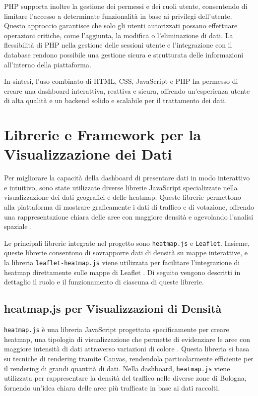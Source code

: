 PHP supporta inoltre la gestione dei permessi e dei ruoli utente, consentendo di limitare l’accesso a determinate funzionalità in base ai privilegi dell’utente. Questo approccio garantisce che solo gli utenti autorizzati possano effettuare operazioni critiche, come l’aggiunta, la modifica o l’eliminazione di dati. La flessibilità di PHP nella gestione delle sessioni utente e l'integrazione con il database rendono possibile una gestione sicura e strutturata delle informazioni all'interno della piattaforma.

In sintesi, l'uso combinato di HTML, CSS, JavaScript e PHP ha permesso di creare una dashboard interattiva, reattiva e sicura, offrendo un’esperienza utente di alta qualità e un backend solido e scalabile per il trattamento dei dati.

\section{Librerie e Framework per la Visualizzazione dei Dati}

Per migliorare la capacità della dashboard di presentare dati in modo interattivo e intuitivo, sono state utilizzate diverse librerie JavaScript specializzate nella visualizzazione dei dati geografici e delle heatmap. Queste librerie permettono alla piattaforma di mostrare graficamente i dati di traffico e di votazione, offrendo una rappresentazione chiara delle aree con maggiore densità e agevolando l'analisi spaziale \cite{krzywinski2010data}.

Le principali librerie integrate nel progetto sono \texttt{heatmap.js} e \texttt{Leaflet}. Insieme, queste librerie consentono di sovrapporre dati di densità su mappe interattive, e la libreria \texttt{leaflet-heatmap.js} viene utilizzata per facilitare l’integrazione di heatmap direttamente sulle mappe di Leaflet \cite{harrower2003colorbrewer} \cite{coburn2014}. Di seguito vengono descritti in dettaglio il ruolo e il funzionamento di ciascuna di queste librerie.

\subsection{heatmap.js per Visualizzazioni di Densità}
\texttt{heatmap.js} è una libreria JavaScript progettata specificamente per creare heatmap, una tipologia di visualizzazione che permette di evidenziare le aree con maggiore intensità di dati attraverso variazioni di colore \cite{tufte1983visual}. Questa libreria si basa su tecniche di rendering tramite Canvas, rendendola particolarmente efficiente per il rendering di grandi quantità di dati. Nella dashboard, \texttt{heatmap.js} viene utilizzata per rappresentare la densità del traffico nelle diverse zone di Bologna, fornendo un’idea chiara delle aree più trafficate in base ai dati raccolti.


